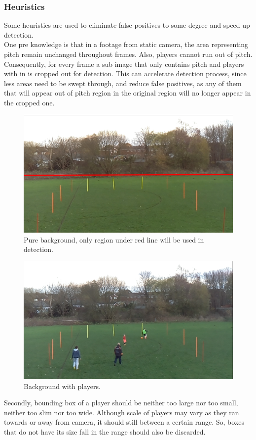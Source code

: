 \documentclass{article}
\begin{document}
\subsubsection{Heuristics}
Some heuristics are used to eliminate false positives to some degree and speed up detection.\\
One pre knowledge is that in a footage from static camera, the area representing pitch remain unchanged throughout frames.
Also, players cannot run out of pitch. Consequently, for every frame a sub image that only contains pitch and players with in is cropped out for detection. This can accelerate detection process, since less areas need to be swept through, and reduce false positives, as any of them that will appear out of pitch region in the original region will no longer appear in the cropped one.\\
\begin{figure}
  \centering
  \includegraphics[scale=0.2]{report/pic/3/background.jpg} 
  \caption{Pure background, only region under red line will be used in detection.}
\end{figure}
\begin{figure}
  \centering
  \includegraphics[scale=0.2]{report/pic/3/foreground.png} 
  \caption{Background with players.}
\end{figure}
Secondly, bounding box of a player should be neither too large nor too small, neither too slim nor too wide. Although scale of players may vary as they ran towards or away from camera, it should still between a certain range. So, boxes that do not have its size fall in the range should also be discarded.
\end{document}

